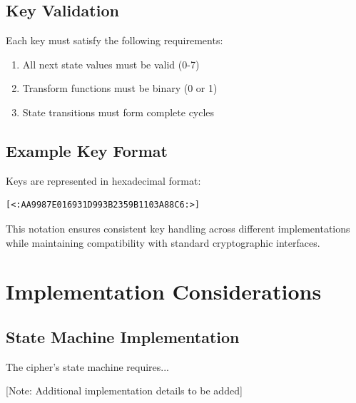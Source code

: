 \subsection{Key Validation}

Each key must satisfy the following requirements:
\begin{enumerate}
    \item All next state values must be valid (0-7)
    \item Transform functions must be binary (0 or 1)
    \item State transitions must form complete cycles
\end{enumerate}

\subsection{Example Key Format}
Keys are represented in hexadecimal format:
\begin{verbatim}
[<:AA9987E016931D993B2359B1103A88C6:>]
\end{verbatim}

This notation ensures consistent key handling across different implementations while maintaining compatibility with standard cryptographic interfaces.

\section{Implementation Considerations}

\subsection{State Machine Implementation}
The cipher's state machine requires...

[Note: Additional implementation details to be added]